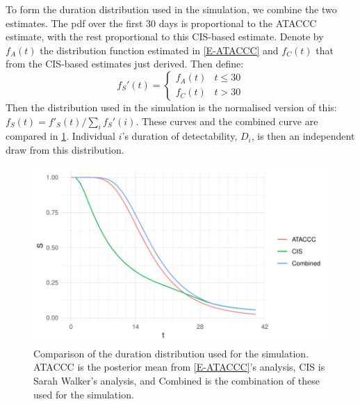 \documentclass[thesis.tex]{subfiles}
\begin{document}

To form the duration distribution used in the simulation, we combine the two estimates.
The pdf over the first 30 days is proportional to the ATACCC estimate, with the rest proportional to this CIS-based estimate.
Denote by $f_A(t)$ the distribution function estimated in \cref{E-ATACCC} and $f_C(t)$ that from the CIS-based estimates just derived.
Then define:
$$
f_S'(t) = \begin{cases}
	f_A(t) &t \leq 30 \\
	f_C(t) &t > 30
\end{cases}
$$
Then the distribution used in the simulation is the normalised version of this: $f_S(t) = f'_S(t)/\sum_i f_S'(i)$.
These curves and the combined curve are compared in \cref{perf-test:fig:duration-dist}.
Individual $i$'s duration of detectability, $D_i$, is then an independent draw from this distribution.
\begin{figure}
  \centering \includegraphics{cis-perfect-testing/input-duration-dists}
  \caption[Comparison of duration distributions]{Comparison of the duration distribution used for the simulation. ATACCC is the posterior mean from \cref{E-ATACCC}'s analysis, CIS is Sarah Walker's analysis, and Combined is the combination of these used for the simulation. \label{perf-test:fig:duration-dist}}
\end{figure}
\end{document}
